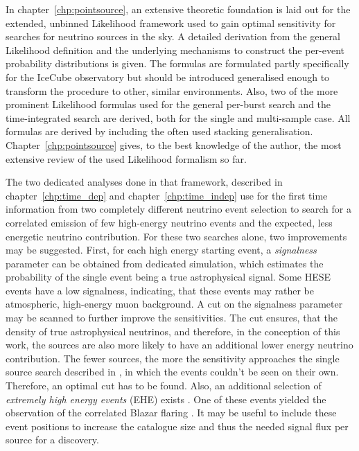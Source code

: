 In chapter~\ref{chp:pointsource}, an extensive theoretic foundation is laid out for the extended, unbinned Likelihood framework used to gain optimal sensitivity for searches for neutrino sources in the sky.
A detailed derivation from the general Likelihood definition and the underlying mechanisms to construct the per-event probability distributions is given.
The formulas are formulated partly specifically for the IceCube observatory but should be introduced generalised enough to transform the procedure to other, similar environments.
Also, two of the more prominent Likelihood formulas used for the general per-burst search and the time-integrated search are derived, both for the single and multi-sample case.
All formulas are derived by including the often used stacking generalisation.
Chapter~\ref{chp:pointsource} gives, to the best knowledge of the author, the most extensive review of the used Likelihood formalism so far.

The two dedicated analyses done in that framework, described in chapter~\ref{chp:time_dep} and chapter~\ref{chp:time_indep} use for the first time information from two completely different neutrino event selection to search for a correlated emission of few high-energy neutrino events and the expected, less energetic neutrino contribution.
For these two searches alone, two improvements may be suggested.
First, for each high energy starting event, a \emph{signalness} parameter can be obtained from dedicated simulation, which estimates the probability of the single event being a true astrophysical signal.
Some HESE events have a low signalness, indicating, that these events may rather be atmospheric, high-energy muon background.
A cut on the signalness parameter may be scanned to further improve the sensitivities.
The cut ensures, that the density of true astrophysical neutrinos, and therefore, in the conception of this work, the sources are also more likely to have an additional lower energy neutrino contribution.
The fewer sources, the more the sensitivity approaches the single source search described in \cite{Aartsen:2016oji}, in which the events couldn't be seen on their own.
Therefore, an optimal cut has to be found.
Also, an additional selection of \emph{extremely high energy events} (EHE) exists \cite{Yoshida:2017ghs,Aartsen:2016ngq}.
One of these events yielded the observation of the correlated Blazar flaring \cite{IceCube:2018cha}.
It may be useful to include these event positions to increase the catalogue size and thus the needed signal flux per source for a discovery.

